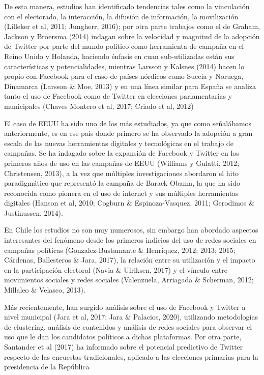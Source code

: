 \documentclass[
  10pt,
  letterpaper,
]{report}
\begin{document}
De esta manera, estudios han identificado tendencias tales como la
vinculación con el electorado, la interacción, la difusión de
información, la movilización (Lilleker et al, 2011; Jungherr, 2016); por
otra parte trabajos como el de Graham, Jackson y Broersma (2014) indagan
sobre la velocidad y magnitud de la adopción de Twitter por parte del
mundo político como herramienta de campaña en el Reino Unido y Holanda,
haciendo énfasis en cuan sub-utilizadas están sus características y
potencialidades, mientras Larsson y Kalsnes (2014) hacen lo propio con
Facebook para el caso de países nórdicos como Suecia y Noruega,
Dinamarca (Larsson \& Moe, 2013) y en una línea similar para España se
analiza tanto el uso de Facebook como de Twitter en elecciones
parlamentarias y municipales (Chaves Montero et al, 2017; Criado et al,
2012)

El caso de EEUU ha sido uno de los más estudiados, ya que como
señalábamos anteriormente, es en ese país donde primero se ha observado
la adopción a gran escala de las nuevas herramientas digitales y
tecnológicas en el trabajo de campañas. Se ha indagado sobre la
expansión de Facebook y Twitter en los primeros años de uso en las
campañas de EEUU (Williams y Gulatti, 2012; Christensen, 2013), a la vez
que múltiples investigaciones abordaron el hito paradigmático que
representó la campaña de Barack Obama, la que ha sido reconocida como
pionera en el uso de internet y sus múltiples herramientas digitales
(Hanson et al, 2010; Cogburn \& Espinoza-Vasquez, 2011; Gerodimos \&
Justinussen, 2014).

En Chile los estudios no son muy numerosos, sin embargo han abordado
aspectos interesantes del fenómeno desde los primeros indicios del uso
de redes sociales en campañas políticas (Gonzalez-Bustamante \&
Henríquez, 2012; 2013; 2015; Cárdenas, Ballesteros \& Jara, 2017), la
relación entre su utilización y el impacto en la participación electoral
(Navia \& Ulriksen, 2017) y el vínculo entre movimientos sociales y
redes sociales (Valenzuela, Arriagada \& Scherman, 2012; Millaleo \&
Velasco, 2013).

Más recientemente, han surgido análisis sobre el uso de Facebook y
Twitter a nivel municipal (Jara et al, 2017; Jara \& Palacios, 2020),
utilizando metodologías de clustering, análisis de contenidos y análisis
de redes sociales para observar el uso que le dan los candidatos
políticos a dichas plataformas. Por otra parte, Santander et al (2017)
ha informado sobre el potencial predictivo de Twitter respecto de las
encuestas tradicionales, aplicado a las elecciones primarias para la
presidencia de la República
\end{document}
